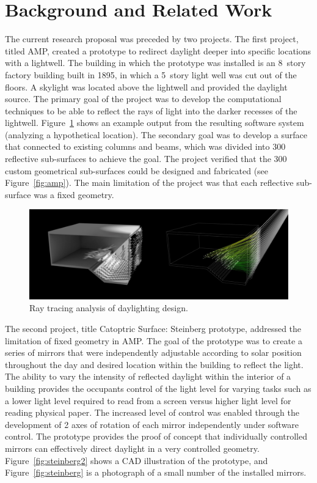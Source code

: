\section{Background and Related Work}
\label{sec:background}

The current research proposal was preceded by two projects.
The first project, titled AMP, created a prototype to redirect
daylight deeper into specific locations with a lightwell.
The building in which the prototype was installed is an 8~story factory
building built in 1895, in which a 5~story light well was cut out of
the floors. A skylight was located above the lightwell and provided the
daylight source.  The primary goal of the project was to develop the
computational techniques to be able to reflect the rays of light into
the darker recesses of the lightwell. 
Figure~\ref{fig:raytracing} shows an example output from the resulting software
system (analyzing a hypothetical location).
The secondary goal was to develop
a surface that connected to existing columns and beams, which was
divided into 300 reflective sub-surfaces to achieve the goal.
The project verified that the 300 custom geometrical sub-surfaces
could be designed and fabricated (see Figure~\ref{fig:amp}).
The main limitation of the project
was that each reflective sub-surface was a fixed geometry.

\begin{figure}[ht]
\centering
\includegraphics[width=0.8\linewidth]{figures/raytracing}
\caption{Ray tracing analysis of daylighting design.}
\label{fig:raytracing}
\end{figure}

The second project, title Catoptric Surface: Steinberg prototype,
addressed the limitation of fixed geometry in AMP. The goal of the
prototype was to create a series of mirrors that were independently
adjustable according to solar position throughout the day and desired
location within the building to reflect the light. The ability to
vary the intensity of reflected daylight within the interior of a
building provides the occupants control of the light level for varying tasks
such as a lower light level required to read from a screen versus higher
light level for reading physical paper. The increased level of control
was enabled through the development of 2 axes of rotation of each mirror
independently under software control. The prototype provides the proof
of concept that individually controlled mirrors can effectively direct
daylight in a very controlled geometry. 
Figure~\ref{fig:steinberg2} shows a CAD illustration of the prototype,
and Figure~\ref{fig:steinberg} is a photograph of a small number of
the installed mirrors.

